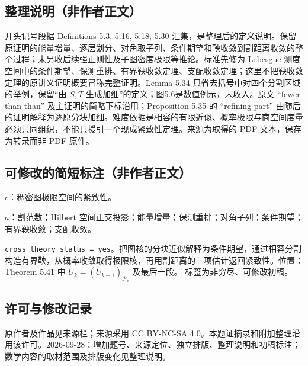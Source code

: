 \documentclass[UTF8,11pt]{ctexart}
\theoremstyle{definition}
\begin{document}
\subsection*{整理说明（非作者正文）}
开头记号段据 Definitions 5.3, 5.16, 5.18, 5.30 汇集，是整理后的定义说明。保留原证明的能量增量、逐层划分、对角取子列、条件期望和鞅收敛到割距离收敛的整个过程；未另收后续强正则性及子图密度极限等推论。标准先修为 Lebesgue 测度空间中的条件期望、保测重排、有界鞅收敛定理、支配收敛定理；这里不把鞅收敛定理的原讲义证明概要冒称完整证明。Lemma 5.34 只省去括号中对四个分割区域的举例，保留“由 $S,T$ 生成加细”的定义；图5.6是数值例示，未收入。原文 ``fewer than than'' 及主证明的简略下标沿用；Proposition 5.35 的 ``refining part'' 由随后的证明解释为逐原分块加细。难度依据是相容的有限近似、概率极限与商空间度量必须共同组织，不能只援引一个现成紧致性定理。来源为取得的 PDF 文本，保存为转录而非 PDF 原件。
\subsection*{可修改的简短标注（非作者正文）}
$c$：稠密图极限空间的紧致性。

$a$：割范数；Hilbert 空间正交投影；能量增量；保测重排；对角子列；条件期望；有界鞅收敛；支配收敛。

\texttt{cross\_theory\_status = yes}。把图核的分块近似解释为条件期望，通过相容分割构造有界鞅，从概率收敛取得极限核，再用割距离的三项估计返回紧致性。位置：Theorem 5.41 中 $U_k=(U_{k+1})_{\mathcal P_k}$ 及最后一段。
标签为非穷尽、可修改初稿。
\subsection*{许可与修改记录}
原作者及作品见来源栏；来源采用 CC BY-NC-SA 4.0。本题证摘录和附加整理沿用该许可。2026-09-28：增加题号、来源定位、独立排版、整理说明和初稿标注；数学内容的取材范围及排版变化见整理说明。
\end{document}
